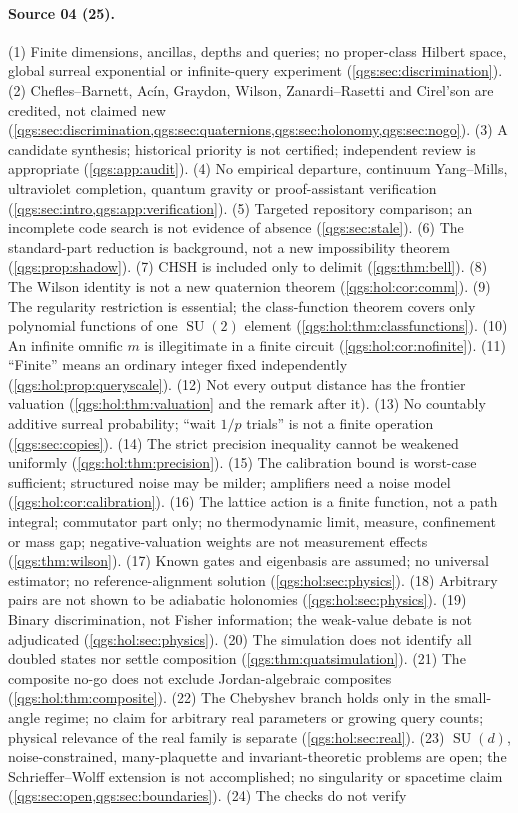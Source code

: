 \documentclass[11pt,oneside]{article}
\numberwithin{equation}{section}
\theoremstyle{plain}
\theoremstyle{definition}
\theoremstyle{remark}
\DeclareMathOperator{\SU}{SU}
\begin{document}
\paragraph{Source 04 (25).}
(1) Finite dimensions, ancillas, depths and queries; no proper-class Hilbert space, global surreal exponential or infinite-query experiment (\cref{qgs:sec:discrimination}). (2) Chefles--Barnett, Ac\'in, Graydon, Wilson, Zanardi--Rasetti and Cirel'son are credited, not claimed new (\cref{qgs:sec:discrimination,qgs:sec:quaternions,qgs:sec:holonomy,qgs:sec:nogo}). (3) A candidate synthesis; historical priority is not certified; independent review is appropriate (\cref{qgs:app:audit}). (4) No empirical departure, continuum Yang--Mills, ultraviolet completion, quantum gravity or proof-assistant verification (\cref{qgs:sec:intro,qgs:app:verification}). (5) Targeted repository comparison; an incomplete code search is not evidence of absence (\cref{qgs:sec:stale}). (6) The standard-part reduction is background, not a new impossibility theorem (\cref{qgs:prop:shadow}). (7) CHSH is included only to delimit (\cref{qgs:thm:bell}). (8) The Wilson identity is not a new quaternion theorem (\cref{qgs:hol:cor:comm}). (9) The regularity restriction is essential; the class-function theorem covers only polynomial functions of one $\SU(2)$ element (\cref{qgs:hol:thm:classfunctions}). (10) An infinite omnific $m$ is illegitimate in a finite circuit (\cref{qgs:hol:cor:nofinite}). (11) ``Finite'' means an ordinary integer fixed independently (\cref{qgs:hol:prop:queryscale}). (12) Not every output distance has the frontier valuation (\cref{qgs:hol:thm:valuation} and the remark after it). (13) No countably additive surreal probability; ``wait $1/p$ trials'' is not a finite operation (\cref{qgs:sec:copies}). (14) The strict precision inequality cannot be weakened uniformly (\cref{qgs:hol:thm:precision}). (15) The calibration bound is worst-case sufficient; structured noise may be milder; amplifiers need a noise model (\cref{qgs:hol:cor:calibration}). (16) The lattice action is a finite function, not a path integral; commutator part only; no thermodynamic limit, measure, confinement or mass gap; negative-valuation weights are not measurement effects (\cref{qgs:thm:wilson}). (17) Known gates and eigenbasis are assumed; no universal estimator; no reference-alignment solution (\cref{qgs:hol:sec:physics}). (18) Arbitrary pairs are not shown to be adiabatic holonomies (\cref{qgs:hol:sec:physics}). (19) Binary discrimination, not Fisher information; the weak-value debate is not adjudicated (\cref{qgs:hol:sec:physics}). (20) The simulation does not identify all doubled states nor settle composition (\cref{qgs:thm:quatsimulation}). (21) The composite no-go does not exclude Jordan-algebraic composites (\cref{qgs:hol:thm:composite}). (22) The Chebyshev branch holds only in the small-angle regime; no claim for arbitrary real parameters or growing query counts; physical relevance of the real family is separate (\cref{qgs:hol:sec:real}). (23) $\SU(d)$, noise-constrained, many-plaquette and invariant-theoretic problems are open; the Schrieffer--Wolff extension is not accomplished; no singularity or spacetime claim (\cref{qgs:sec:open,qgs:sec:boundaries}). (24) The checks do not verify 
\end{document}
